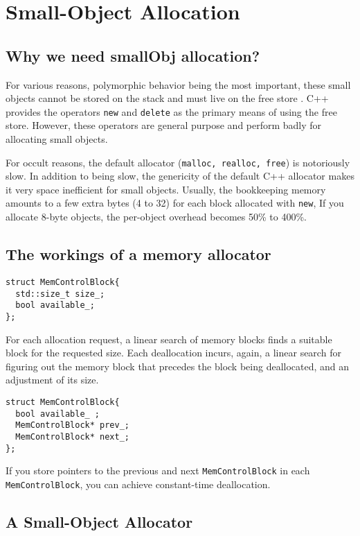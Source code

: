 \newpage
\section{Small-Object Allocation}

\subsection{Why we need smallObj allocation?}

For various reasons, polymorphic behavior being the most important,
these small objects cannot be stored on the stack and must live on the
free store . C++ provides the operators \texttt{new} and
\texttt{delete} as the primary means of using the free store.
However, these operators are general purpose and perform badly for
allocating small objects.

For occult reasons, the default allocator (\texttt{malloc, realloc, free}) is
notoriously slow. In addition to being slow, the genericity of the
default C++ allocator makes it very space inefficient for small
objects.  Usually, the bookkeeping memory amounts to a few extra bytes
(4 to 32) for each block allocated with \texttt{new}, If you allocate
8-byte objects, the per-object overhead becomes 50\% to 400\%.

\subsection{The workings of a memory allocator}

\begin{verbatim}
struct MemControlBlock{
  std::size_t size_;
  bool available_;
};
\end{verbatim}

For each allocation request, a linear search of memory blocks finds a
suitable block for the requested size. Each deallocation incurs,
again, a linear search for figuring out the memory block that precedes
the block  being deallocated, and an adjustment of its size.

\begin{verbatim}
struct MemControlBlock{
  bool available_ ;
  MemControlBlock* prev_;
  MemControlBlock* next_;
};
\end{verbatim}

If you store pointers to the previous and next
\texttt{MemControlBlock} in each \texttt{MemControlBlock}, you can
achieve constant-time deallocation.

\subsection{A Small-Object Allocator}

